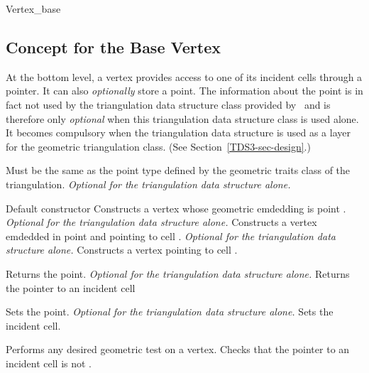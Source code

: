 	\begin{ccClass}{Vertex_base}
	\subsection{Concept for the Base Vertex}


At the bottom level, a vertex provides access to
one of its incident cells through a  pointer. 
It can also \textit{optionally} store a point. The
information about the point is in fact not used by the triangulation
data structure class provided by \cgal\ and is therefore only
\textit{optional} when this triangulation data structure class is used
alone. It becomes compulsory when the 
triangulation data structure is used as a layer for the geometric
triangulation class. (See Section~\ref{TDS3-sec-design}.)

\ccTypes
{}
{Must be the same as the point type  defined by the
geometric traits class of the triangulation. {\textit{Optional for the
triangulation data structure alone.}}} 

\ccCreation

{Default constructor}
\ccGlue
{}
{Constructs a vertex whose geometric emdedding is point
. {\textit{Optional for the triangulation data structure
alone.}}} 
\ccGlue
{}
{Constructs a vertex emdedded in point  and pointing to cell
. {\textit{Optional for the triangulation data structure alone.}}}
\ccGlue
{}
{Constructs a vertex pointing to cell .}

\ccAccessFunctions

{Returns the point. {\textit{Optional for the triangulation data
structure alone.}}} 
\ccGlue
{}
{Returns the pointer to an incident cell}


{Sets the point. {\textit{Optional for the triangulation data
structure alone.}}} 
\ccGlue
{}
{Sets the incident cell.}

{Performs any desired geometric test on a vertex. Checks that the
pointer to an incident cell is not .}


\end{ccClass}
